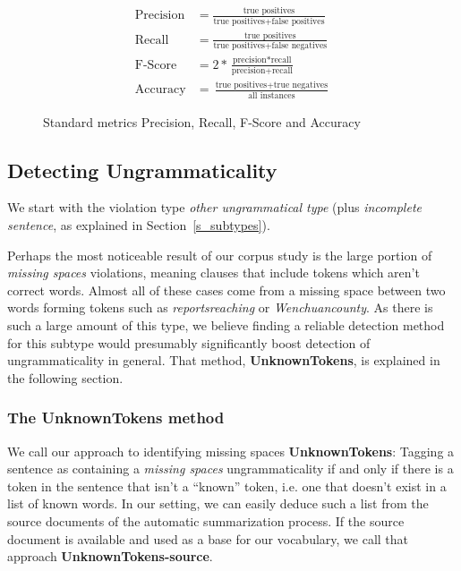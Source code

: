 \documentclass[a4paper,10pt]{scrartcl}
\theoremstyle{style}
\begin{document}
\begin{figure}[H]
	\begin{subequations*}
	\begin{align*}
		\text{Precision} &= \frac{\text{true positives}}{\text{true positives} + \text{false positives}}\\
		\text{Recall} &= \frac{\text{true positives}}{\text{true positives} + \text{false negatives}}\\
		\text{F-Score} &= 2*\frac{\text{precision}*\text{recall}}{\text{precision}+\text{recall}}\\
		\text{Accuracy} &= \frac{\text{true positives}+\text{true negatives}}{\text{all instances}}
	\end{align*}
	\end{subequations*}
	\label{metrics}
	\caption{Standard metrics Precision, Recall, F-Score and Accuracy}
\end{figure}

\newpage
\subsection{Detecting Ungrammaticality}
\label{sec_unknowntokens}
We start with the violation type \textit{other ungrammatical type} (plus \textit{incomplete sentence}, as explained in Section~\ref{s_subtypes}).

Perhaps the most noticeable result of our corpus study is the large portion of \textit{missing spaces} violations, meaning clauses that include tokens which aren't correct words. Almost all of these cases come from a missing space between two words forming tokens such as \textit{reportsreaching} or \textit{Wenchuancounty}. As there is such a large amount of this type, we believe finding a reliable detection method for this subtype would presumably significantly boost detection of ungrammaticality in general. That method, \textbf{UnknownTokens}, is explained in the following section.

\subsubsection{The UnknownTokens method}
We call our approach to identifying missing spaces \textbf{UnknownTokens}: Tagging a sentence as containing a \textit{missing spaces} ungrammaticality if and only if there is a token in the sentence that isn't a ``known'' token, i.e. one that doesn't exist in a list of known words. In our setting, we can easily deduce such a list from the source documents of the automatic summarization process. If the source document is available and used as a base for our vocabulary, we call that approach \textbf{UnknownTokens-source}.
\end{document}
